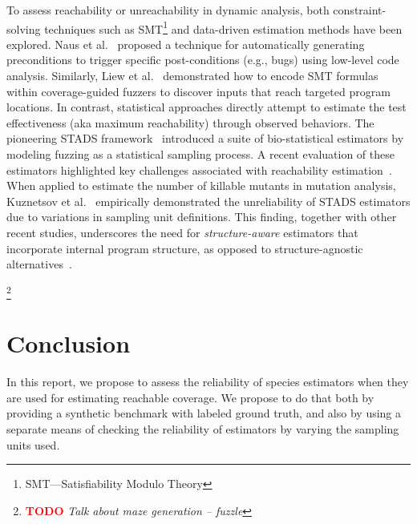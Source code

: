 \documentclass[conference]{IEEEtran}
\newcounter{todocounter}
\newcommand{\todo}[1]{\marginpar{$|$}\textcolor{red}{\stepcounter{todocounter}\footnote[\thetodocounter]{\textcolor{red}{\textbf{TODO }}\textit{#1}}}}
\begin{document}
To assess reachability or unreachability in dynamic analysis, both constraint-solving techniques such as SMT\footnote{SMT—Satisfiability Modulo Theory} and data-driven estimation methods have been explored. Naus et al.~\cite{naus2023low} proposed a technique for automatically generating preconditions to trigger specific post-conditions (e.g., bugs) using low-level code analysis. Similarly, Liew et al.~\cite{liew2019just} demonstrated how to encode SMT formulas within coverage-guided fuzzers to discover inputs that reach targeted program locations. In contrast, statistical approaches directly attempt to estimate the test effectiveness (aka maximum reachability) through observed behaviors. The pioneering STADS framework~\cite{boehme2018stads} introduced a suite of bio-statistical estimators by modeling fuzzing as a statistical sampling process. A recent evaluation of these estimators highlighted key challenges associated with reachability estimation~\cite{liyanage2023reachable}. When applied to estimate the number of killable mutants in mutation analysis, Kuznetsov et al.~\cite{Kuznetsov2024empirical} empirically demonstrated the unreliability of STADS estimators due to variations in sampling unit definitions. This finding, together with other recent studies, underscores the need for \emph{structure-aware} estimators that incorporate internal program structure, as opposed to structure-agnostic alternatives~\cite{lee2023statistical}.

\todo{Talk about maze generation -- fuzzle}

\section{Conclusion}
\label{sec:conclusion}
In this report, we propose to assess the reliability of species estimators when
they are used for estimating reachable coverage. We propose to do that both by
providing a synthetic benchmark with labeled ground truth, and also by
using a separate means of checking the reliability of estimators by varying
the sampling units used.


\balance





\end{document}
